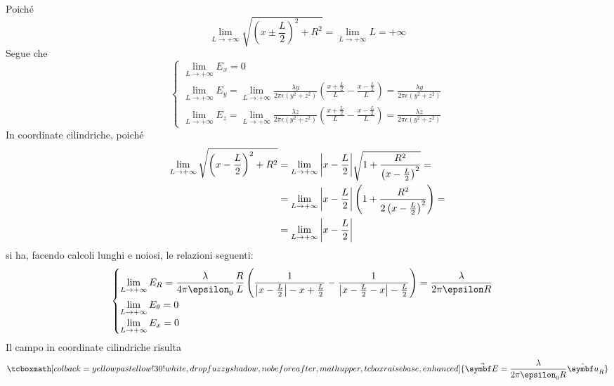 	Poiché
	\begin{equation*}
		\lim_{L\to+\infty}\sqrt{\left(x\pm\frac{L}{2}\right)^2+R^2}=\lim_{L\to+\infty}L=+\infty
	\end{equation*}
	Segue che
	\begin{equation*}\displaystyle
		\begin{cases}
			\displaystyle\lim_{L\to+\infty}E_x=0\\
			\displaystyle\lim_{L\to+\infty}E_y=\lim_{L\to+\infty}\frac{\lambda y}{2\pi\epsilon\left(y^2+z^2\right)}\left(\frac{x+\frac{L}{2}}{L}-\frac{x-\frac{L}{2}}{L}\right)=\frac{\lambda y}{2\pi\epsilon\left(y^2+z^2\right)}\\
			\displaystyle\lim_{L\to+\infty}E_z=\lim_{L\to+\infty}\frac{\lambda z}{2\pi\epsilon\left(y^2+z^2\right)}\left(\frac{x+\frac{L}{2}}{L}-\frac{x-\frac{L}{2}}{L}\right)=\frac{\lambda z}{2\pi\epsilon\left(y^2+z^2\right)}
		\end{cases}
	\end{equation*}
In coordinate cilindriche, poiché
\begin{align*}
	\lim_{L\to+\infty}\sqrt{\left(x-\frac{L}{2}\right)^2+R^2}&=\lim_{L\to+\infty}\abs{x-\frac{L}{2}}\sqrt{1+\frac{R^2}{\left(x-\frac{L}{2}\right)^2}}=\\
	&=\lim_{L\to+\infty}\abs{x-\frac{L}{2}}\left(1+\frac{R^2}{2\left(x-\frac{L}{2}\right)^2}\right)=\\
	&=\lim_{L\to+\infty}\abs{x-\frac{L}{2}}
\end{align*}
si ha, facendo calcoli lunghi e noiosi, le relazioni seguenti:
\begin{equation*}
	\begin{cases}
		\displaystyle\lim_{L\to+\infty}E_R=\frac{\lambda}{4\pi\epsilon_0}\frac{R}{L}\left(\frac{1}{\abs{x-\frac{L}{2}}-x+\frac{L}{2}}-\frac{1}{\abs{x-\frac{L}{2}-x}-\frac{L}{2}}\right)=\frac{\lambda}{2\pi\epsilon R}\\
		\displaystyle\lim_{L\to+\infty}E_\theta=0\\
		\displaystyle\lim_{L\to+\infty}E_x=0
	\end{cases}
\end{equation*}
Il campo in coordinate cilindriche risulta
	\begin{equation}
		\tcboxmath[colback=yellowpastellow!30!white,drop fuzzy shadow, nobeforeafter, math upper, tcbox raise base, enhanced]{\vba{E}=\frac{\lambda}{2\pi\epsilon_0R}\vbh{u}_R}
	\end{equation}
